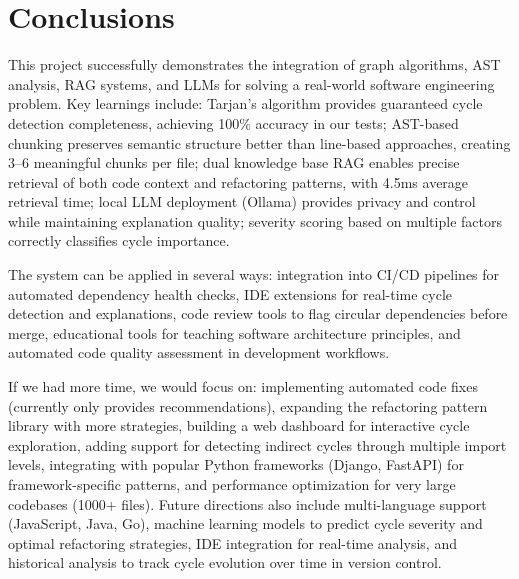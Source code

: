 \documentclass[paper=a4, fontsize=11pt]{scrartcl} %
\begin{document}
\section{Conclusions}

This project successfully demonstrates the integration of graph algorithms, AST analysis, RAG systems, and LLMs for solving a real-world software engineering problem. Key learnings include: Tarjan's algorithm provides guaranteed cycle detection completeness, achieving 100\% accuracy in our tests; AST-based chunking preserves semantic structure better than line-based approaches, creating 3--6 meaningful chunks per file; dual knowledge base RAG enables precise retrieval of both code context and refactoring patterns, with 4.5ms average retrieval time; local LLM deployment (Ollama) provides privacy and control while maintaining explanation quality; severity scoring based on multiple factors correctly classifies cycle importance.

The system can be applied in several ways: integration into CI/CD pipelines for automated dependency health checks, IDE extensions for real-time cycle detection and explanations, code review tools to flag circular dependencies before merge, educational tools for teaching software architecture principles, and automated code quality assessment in development workflows.

If we had more time, we would focus on: implementing automated code fixes (currently only provides recommendations), expanding the refactoring pattern library with more strategies, building a web dashboard for interactive cycle exploration, adding support for detecting indirect cycles through multiple import levels, integrating with popular Python frameworks (Django, FastAPI) for framework-specific patterns, and performance optimization for very large codebases (1000+ files). Future directions also include multi-language support (JavaScript, Java, Go), machine learning models to predict cycle severity and optimal refactoring strategies, IDE integration for real-time analysis, and historical analysis to track cycle evolution over time in version control.
\end{document}
